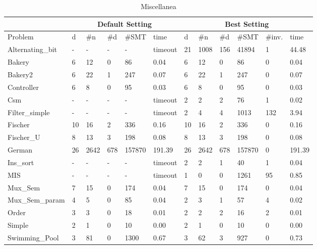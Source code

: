 \documentclass{LMCS}
\theoremstyle{plain}\newtheorem{assumption}[thm]{Assumption}
\theoremstyle{plain}\newtheorem{proposition}[thm]{Proposition}
\theoremstyle{plain}\newtheorem{property}[thm]{Property}
\theoremstyle{plain}\newtheorem{example}[thm]{Example}
\theoremstyle{plain}\newtheorem{claim}[thm]{Claim}
\theoremstyle{plain}\newtheorem{lemma}[thm]{Lemma}
\begin{document}
\begin{table}[t]
\small
\caption{\label{subapp:misc}Miscellanea}
\begin{tabular}{||l|l|l|l|l|l||l|l|l|l|l|l||}
\hline\hline
& \multicolumn{5}{|c||}{Default Setting} & 
  \multicolumn{6}{|c||}{Best Setting} \\ \hline
Problem  & d & \#n & \#d & \#SMT & time 
         & d & \#n & \#d & \#SMT & \#inv. & time \\ \hline\hline
Alternating\_bit & -	 &- 	 &- 	 &- 	 & timeout 	  
                 & 	21 & 	1008 & 	156 & 	41894 & 	1 & 	44.48 \\ \hline
Bakery & 	6 & 	12 & 	0 & 	86 & 	0.04 
       & 	6 & 	12 & 	0 & 	86 & 	0 & 	0.04 \\ \hline
Bakery2 & 	6 & 	22 & 	1 & 	247 & 	0.07 
        & 	6 & 	22 & 	1 & 	247 & 	0 & 	0.07 \\ \hline
Controller & 	6 & 	8 & 	0 & 	95 & 	0.03 
           & 	6 & 	8 & 	0 & 	95 & 	0 & 	0.03 \\ \hline
Csm & 	- & 	- & 	- & 	- & 	timeout 
    & 	2 & 	2 & 	2 & 	76 & 	1 & 	0.02 \\ \hline
Filter\_simple & 	- & 	- & 	- & 	- & 	timeout 
               & 	2 & 	4 & 	4 & 	1013 & 	132 & 	3.94 \\ \hline
Fischer & 	10 & 	16 & 	2 & 	336 & 	0.16 
        & 	10 & 	16 & 	2 & 	336 & 	0 & 	0.16 \\ \hline
Fischer\_U & 	8 & 	13 & 	3 & 	198 & 	0.08
           & 	8 & 	13 & 	3 & 	198 & 	0 & 	0.08 \\ \hline
German & 	26 & 	2642 & 	678 & 	157870 & 	191.39 
       & 	26 & 	2642 & 	678 & 	157870 & 	0 & 	191.39 \\ \hline
Ins\_sort & 	- & 	- & 	- & 	- & 	timeout 
          & 	2 & 	2 & 	1 & 	40 & 	1 & 	0.04 \\ \hline
MIS & -	 & -	 &- 	 &- 	 & timeout 
    & 	1 & 	0 & 	0 & 	1261 & 	95 & 	0.85 \\ \hline
Mux\_Sem & 	7 & 	15 & 	0 & 	174 & 	0.04 
         & 	7 & 	15 & 	0 & 	174 & 	0 & 	0.04 \\ \hline
Mux\_Sem\_param & 	4 & 	5 & 	0 & 	85 & 	0.04 
                & 	2 & 	3 & 	1 & 	57 & 	4 & 	0.02 \\ \hline
Order & 	3 & 	3 & 	0 & 	18 & 	0.01 
      & 	2 & 	2 & 	2 & 	16 & 	2 & 	0.01 \\ \hline
Simple & 	2 & 	1 & 	0 & 	10 & 	0.00 
       & 	2 & 	1 & 	0 & 	10 & 	0 & 	0.00 \\ \hline
Swimming\_Pool & 	3 & 	81 & 	0 & 	1300 & 	0.67 
               & 	3 & 	62 & 	3 & 	927 & 	0 & 	0.73 \\ \hline

\end{tabular}
\end{table}
\end{document}
